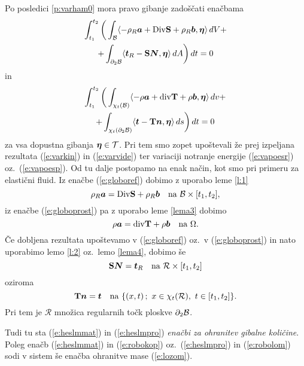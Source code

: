 Po posledici \ref{p:varham0} mora pravo gibanje zadoščati enačbama
\begin{multline} \label{e:globoref}
	\int_{t_1}^{t_2}\bigg( \int_{\mathcal B}\langle -\rho_R\boldsymbol a+
	\mathrm {Div}\mathbf S+\rho_R\boldsymbol b,\boldsymbol \eta\rangle \,dV+ \\
	+\int_{\partial_2 \mathcal B}\langle\boldsymbol t_R-\mathbf S\boldsymbol N,\boldsymbol \eta\rangle\,dA\bigg)\,dt=0
\end{multline}
in
\begin{multline} \label{e:globoprost}
	\int_{t_1}^{t_2}\bigg( \int_{\chi_t(\mathcal B)}\langle -\rho\boldsymbol a+
	\mathrm{div}\mathbf T+\rho\boldsymbol b,\boldsymbol \eta\rangle\,dv+ \\
	+\int_{\chi_t(\partial_2 \mathcal B)}\langle\boldsymbol t-\mathbf T\boldsymbol n,\boldsymbol \eta\rangle\,ds\bigg)\,dt=0
\end{multline}
za vsa dopustna gibanja $\boldsymbol \eta\in\mathcal{T}$. Pri tem smo zopet upoštevali
že prej izpeljana rezultata (\ref{e:varkin}) in (\ref{e:varvide}) ter
variaciji notranje energije (\ref{e:vapoesr}) oz.~(\ref{e:vapoesp}).
Od tu dalje postopamo na enak način, kot smo pri primeru za elastični fluid.
Iz enačbe (\ref{e:globoref}) dobimo z uporabo leme \ref{l:1}
\begin{equation} \label{e:heslmmat}
	\rho_R\vek{a}=\Div\ten{S}+\rho_R\vek{b}\quad\textrm{na}\ \B\times[t_1,t_2],
\end{equation}
iz enačbe (\ref{e:globoprost}) pa z uporabo leme \ref{lema3} dobimo
\begin{equation} \label{e:heslmpro}
	\rho\vek{a}=\div\ten{T}+\rho\vek{b}\quad\textrm{na}\ \Omega.
\end{equation}
Če dobljena rezultata upoštevamo v (\ref{e:globoref}) oz.~v (\ref{e:globoprost}) in
nato uporabimo lemo \ref{l:2} oz.~lemo \ref{lema4}, dobimo še
\begin{equation} \label{e:robokop}
	\ten{S}\vek{N}=\vek{t}_R\quad\textrm{na}\ \mathcal{R}\times[t_1,t_2]
\end{equation}
oziroma
\begin{equation} \label{e:robolom}
	\ten{T}\vek{n}=\vek{t}\quad\textrm{na}\ \{(x,t)\,;\ x\in\chi_t(\mathcal{R}),\ t\in[t_1,t_2] \}.
\end{equation}
Pri tem je $\mathcal{R}$ množica regularnih točk ploskve $\partial_2\mathcal B$.

Tudi tu sta (\ref{e:heslmmat}) in (\ref{e:heslmpro}) \emph{enačbi za ohranitev gibalne količine}.
Poleg enačb (\ref{e:heslmmat}) in (\ref{e:robokop}) oz.~(\ref{e:heslmpro}) in (\ref{e:robolom})
sodi v sistem še enačba ohranitve mase (\ref{e:lozom}).

